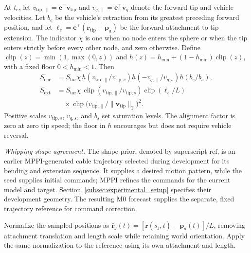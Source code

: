 \documentclass[letterpaper, 10 pt, conference]{ieeeconf}
\begin{document}
At $t_e$, let $v_{\mathrm{tip},\parallel}=\mathbf e^\top\mathbf v_{\mathrm{tip}}$
and $v_{q,\parallel}=\mathbf e^\top\mathbf v_q$ denote the forward
tip and vehicle velocities. Let $b_e$ be the vehicle's retraction
from its greatest preceding forward position, and let
$\ell_e=\mathbf e^\top(\mathbf r_{\mathrm{tip}}-\mathbf p_a)$
be the forward attachment-to-tip extension. The indicator $\chi$
is one when no node enters the sphere or when the tip enters
strictly before every other node, and zero otherwise.
Define $\operatorname{clip}(z)=\min(1,\max(0,z))$ and
$h(z)=h_{\min}+(1-h_{\min})\operatorname{clip}(z)$, with a fixed
floor $0<h_{\min}<1$. Then
\begin{equation}
\begin{aligned}
S_{\mathrm{enc}}
&=S_{\mathrm{tar}}\chi\,h(v_{\mathrm{tip},\parallel}/v_{\mathrm{tip},s})
h(-v_{q,\parallel}/v_{q,s})h(b_e/b_s),\\
S_{\mathrm{ext}}
&=S_{\mathrm{tar}}\chi\,\operatorname{clip}(v_{\mathrm{tip},\parallel}/v_{\mathrm{tip},s})
\operatorname{clip}(\ell_e/L)\\
&\quad\times\operatorname{clip}\!\bigl(
v_{\mathrm{tip},\parallel}/\|\mathbf v_{\mathrm{tip}}\|_2\bigr)^2.
\end{aligned}
\label{eq:directed_motion_scores}
\end{equation}
Positive scales $v_{\mathrm{tip},s}$, $v_{q,s}$, and $b_s$ set
saturation levels. The alignment factor is zero at zero tip speed;
the floor in $h$ encourages but does not require vehicle reversal.

\noindent\emph{Whipping-shape agreement.}
The shape prior, denoted by superscript $\mathrm{ref}$, is an
earlier MPPI-generated cable trajectory selected during development
for its bending and extension sequence. It supplies a desired
motion pattern, while the seed supplies initial commands; MPPI
refines the commands for the current model and target.
Section~\ref{subsec:experimental_setup} specifies their development
geometry. The resulting M0 forecast supplies the separate, fixed
trajectory reference for command correction.

Normalize the sampled positions as
$\bar{\mathbf r}_j(t)=[\mathbf r(s_j,t)-\mathbf p_a(t)]/L$,
removing attachment translation and length scale while retaining
world orientation. Apply the same normalization to the reference
using its own attachment and length.
\end{document}
